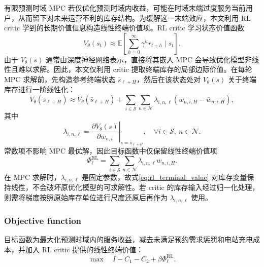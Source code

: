 \documentclass[12pt,hyperref,a4paper,UTF8]{ctexart}
\begin{document}
有限预测时域 MPC 若仅优化预测时域内收益，可能在时域末端过度服务当前用户，从而留下对未来运营不利的库存结构。为缓解这一末端效应，本文利用 RL critic 学到的长期价值信息构造线性终端价值项。RL critic 学习状态价值函数
\begin{equation}
V_{\theta}(s_t)\approx
\mathbb{E}\left[\sum_{h=0}^{\infty}\gamma^h r_{t+h}\mid s_t\right].
\label{eq:critic_value}
\end{equation}
由于 $V_{\theta}(s)$ 通常由深度神经网络表示，直接将其嵌入 MPC 会导致优化模型非线性且难以求解。因此，本文仅利用 critic 提取终端库存的局部边际价值。在每轮 MPC 求解前，先构造参考终端状态 $\bar{s}_{\ell+H}$，然后在该状态处对 $V_{\theta}(s)$ 关于终端库存进行一阶线性化：
\begin{equation}
V_{\theta}(s_{\ell+H})
\approx
V_{\theta}(\bar{s}_{\ell+H})+
\sum_{i\in\mathcal{S}}\sum_{n\in\mathcal{N}}
\lambda_{i,n,\ell}\left(w_{n,i,H}-\bar{w}_{n,i,H}\right),
\label{eq:value_linearization}
\end{equation}
其中
\begin{equation}
\lambda_{i,n,\ell}
=
\left.
\frac{\partial V_{\theta}(s)}{\partial w_{n,i}}
\right|_{s=\bar{s}_{\ell+H}},
\quad \forall i\in\mathcal{S},\ n\in\mathcal{N}.
\label{eq:marginal_value}
\end{equation}
常数项不影响 MPC 最优解，因此目标函数中仅保留线性终端价值项
\begin{equation}
\Phi^{\mathrm{RL}}_{\ell}
=
\sum_{i\in\mathcal{S}}\sum_{n\in\mathcal{N}}
\lambda_{i,n,\ell}w_{n,i,H}.
\label{eq:rl_terminal_value}
\end{equation}
在 MPC 求解时，$\lambda_{i,n,\ell}$ 是固定参数，故式\eqref{eq:rl_terminal_value} 对库存变量保持线性，不会破坏原优化模型的可求解性。若 critic 的库存输入经过归一化处理，则需将梯度按照原始库存单位进行尺度还原后再作为 $\lambda_{i,n,\ell}$ 使用。

\subsubsection{Objective function}

目标函数为最大化预测时域内的服务收益，减去未满足预约需求惩罚和电站充电成本，并加入 RL critic 提供的线性终端价值：
\begin{equation}
\max \quad I-C_1-C_2+\beta\Phi^{\mathrm{RL}}_{\ell}.
\label{eq:objective}
\end{equation}
\end{document}
